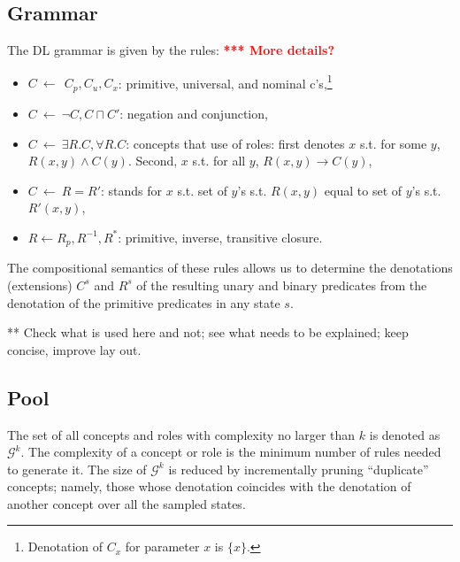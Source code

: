 \documentclass[letterpaper]{article} %
\renewcommand{\S}{\mathcal{S}}
\newcommand{\G}{\mathcal{G}}
\begin{document}
\subsection{Grammar}

The DL grammar is given by the rules: \textcolor{red}{\bf **** More details?}
\begin{itemize}
  \item $C \ \leftarrow\ \ C_p, C_u, C_x$: primitive, universal, and nominal c's,\footnote{Denotation of $C_x$ for parameter $x$ is $\{x\}$.}
  \item $C \ \leftarrow\  \neg C, C \sqcap C'$: negation and conjunction, 
  \item $C \ \leftarrow\  \exists R.C , \forall R.C$: concepts that use of  roles: first denotes $x$ s.t. for some  $y$,  $R(x,y) \land C(y)$.
  Second,  $x$ s.t. for all $y$, $R(x,y) \rightarrow C(y)$,
  \item $C \ \leftarrow\  R=R'$: stands for $x$ s.t. set of $y$'s  s.t. $R(x,y)$ equal to set of $y$'s s.t. $R'(x,y)$,
    \item $R \leftarrow R_p, R^{-1}, R^*$: primitive, inverse, transitive closure.
 \end{itemize}

The  compositional  semantics   of these rules allows us to determine the denotations (extensions)   $C^s$ and $R^s$  of
the resulting unary and binary predicates from the denotation of the primitive predicates in any  state $s$. 

** Check what is used here and not; see what needs to be explained; keep concise, improve lay out.


\subsection{Pool}

The set of all concepts and roles with complexity no larger than $k$ is
denoted as $\G^k$. The complexity of a concept or role is the minimum
number of rules needed to generate it. The size of $\G^k$ is reduced by
incrementally pruning ``duplicate'' concepts; namely, those whose denotation
coincides with the denotation of another concept over all the sampled states.
\end{document}
